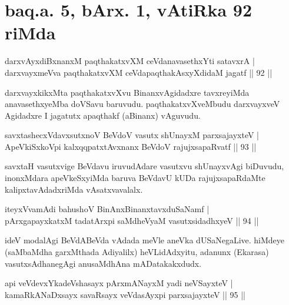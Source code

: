 \section*{baq.a. 5, bArx. 1, vAtiRka 92 riMda}


\begin{shl}
darxvAyxdiBxnanxM paqthakatxvXM ceVdanavasethxYti satavxrA  | \\
darxvayxmeVva paqthakatxvXM ceVdapaqthakAsxyXdidaM jagatf \hfill||  92 || 
\end{shl}

\begin{artha}
darxvayxkikxMta paqthakatxvXvu BinanxvAgidadxre tavxreyiMda anavasethxyeMba doVSavu  baruvudu. paqthakatxvXveMbudu darxvayxveV Agidadxre I jagatutx apaqthakf (aBinanx) vAguvudu.
\end{artha}


\begin{shl}
savxtashecxVdavxsutxnoV BeVdoV vasutx shUnayxM parxsajayxteV  | \\
ApeVkiSxkoV\s pi kalxqqpatxtAvxnanx BeVdoV rajujxsapaRvatf \hfill||  93 ||  
\end{shl}

\begin{artha}
savxtaH vasutxvige BeVdavu iruvudAdare vasutxvu shUnayxvAgi biDuvudu,  inonxMdara apeVkeSxyiMda baruva BeVdavU kUDa rajujxsapaRdaMte kalipxtavAdadxriMda vAsatxvavalalx.
\end{artha}

\begin{shl}
iteyxVvamAdi bahushoV BinAnxBinanxtavxduSaNamf  | \\
pArxgapayxkatxM tadatArxpi saMdheVyaM vasutxsidadhxyeV \hfill||  94 ||  
\end{shl}

\begin{artha}
ideV modalAgi BeVdABeVda vAdada meVle aneVka dUSaNegaLive. hiMdeye (saMbaMdha garxMthada Adiyalilx) heVLidAdxyitu, adanunx (Ekarasa) vasutxsAdhanegAgi anusaMdhAna mADatakakxdudx.
\end{artha}

\begin{shl}
api veVdevxYkadeVshasayx pArxmANayxM yadi neVSayxteV  | \\
kamaRkANaDxsayx savaRsayx veVdasAyxpi parxsajayxteV \hfill||  95 ||  
\end{shl}

